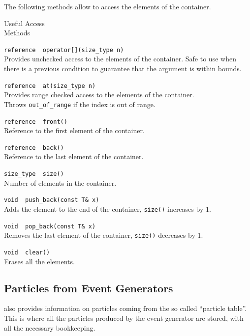 The following methods allow to access the elements of the container.

\begin{Entry}

\item[Useful Access \\Methods]

  \verb+reference  operator[](size_type n)+\\
  Provides unchecked access to the elements of the container.  Safe
  to use when there is a previous condition to guarantee that
  the argument is within bounds.

  \verb+reference  at(size_type n)+\\
  Provides range checked access to the elements of the container.\\
  Throws {\tt out\_of\_range} if the index is out of range.

  \verb+reference  front()+\\
   Reference to the first element of the container.
  
  \verb+reference  back()+\\
   Reference to the last element of the container.

  \verb+size_type  size()+\\
   Number of elements in the container.  

  \verb+void  push_back(const T& x)+\\
  Adds the element to the end of the container, {\tt size()} increases
  by 1.

  \verb+void  pop_back(const T& x)+\\
  Removes the last element of the container, {\tt size()} decreases
  by 1.

  \verb+void  clear()+\\
  Erases all the elements.

\end{Entry}


\subsection{Particles from Event Generators}
\label{sec:particle}

\StMcEvent also provides information on particles coming from the so
called ``particle table''.  This is where all the particles produced
by the event generator are stored, with all the necessary bookkeeping.

